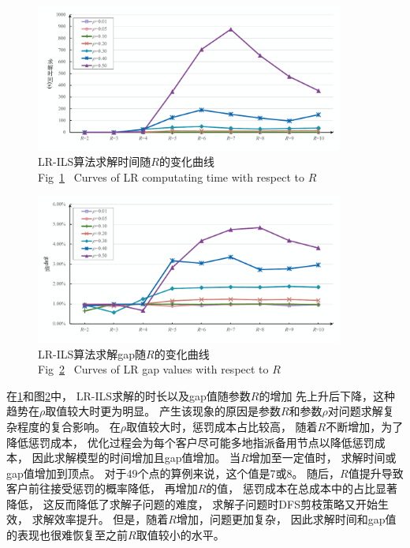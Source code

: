 \begin{figure}[ht] %
	\setlength{\belowcaptionskip}{-0.5cm} 
	  \centering
	  \includegraphics[width=0.9\textwidth]{figures/result_time_with_R.pdf}
	  \caption{LR-ILS算法求解时间随$R$的变化曲线\\Fig~\ref{fig:result_time_r}~ Curves of LR computating time with respect to $R$}
	  \label{fig:result_time_r}
\end{figure}
	
\begin{figure}[ht] %
	\setlength{\belowcaptionskip}{-0.5cm} 
		\centering
		\includegraphics[width=0.9\textwidth]{figures/result_gap_with_R.pdf}
		\caption{LR-ILS算法求解gap随$R$的变化曲线\\Fig~\ref{fig:result_gap_r}~ Curves of LR gap values with respect to $R$}
		\label{fig:result_gap_r}
\end{figure}

在\ref{fig:result_time_r}和图\ref{fig:result_gap_r}中，
LR-ILS求解的时长以及gap值随参数$R$的增加
先上升后下降，这种趋势在$\rho$取值较大时更为明显。
产生该现象的原因是参数$R$和参数$\rho$对问题求解复杂程度的复合影响。
在$\rho$取值较大时，惩罚成本占比较高，
随着$R$不断增加，为了降低惩罚成本，
优化过程会为每个客户尽可能多地指派备用节点以降低惩罚成本，
因此求解模型的时间增加且gap值增加。
当$R$增加至一定值时，
求解时间或gap值增加到顶点。
对于49个点的算例来说，这个值是7或8。
随后，$R$值提升导致
客户前往接受惩罚的概率降低，
再增加$R$的值，
惩罚成本在总成本中的占比显著降低，
这反而降低了求解子问题的难度，
求解子问题时DFS剪枝策略又开始生效，
求解效率提升。
但是，随着$R$增加，问题更加复杂，
因此求解时间和gap值的表现也很难恢复至之前$R$取值较小的水平。

